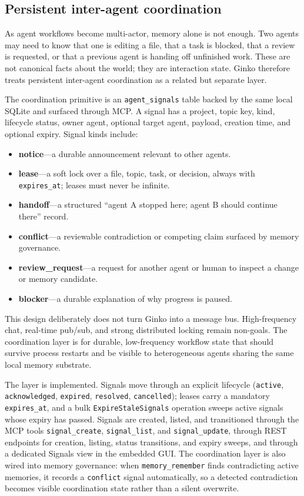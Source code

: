 \documentclass[11pt,a4paper]{article}
\begin{document}
\subsection{Persistent inter-agent coordination}

As agent workflows become multi-actor, memory alone is not enough. Two agents may need to know that one is editing a file, that a task is blocked, that a review is requested, or that a previous agent is handing off unfinished work. These are not canonical facts about the world; they are interaction state. Ginko therefore treats persistent inter-agent coordination as a related but separate layer.

The coordination primitive is an \texttt{agent\_signals} table backed by the same local SQLite and surfaced through MCP. A signal has a project, topic key, kind, lifecycle status, owner agent, optional target agent, payload, creation time, and optional expiry. Signal kinds include:

\begin{itemize}
 \item \textbf{notice}---a durable announcement relevant to other agents.
 \item \textbf{lease}---a soft lock over a file, topic, task, or decision, always with \texttt{expires\_at}; leases must never be infinite.
 \item \textbf{handoff}---a structured ``agent A stopped here; agent B should continue there'' record.
 \item \textbf{conflict}---a reviewable contradiction or competing claim surfaced by memory governance.
 \item \textbf{review\_request}---a request for another agent or human to inspect a change or memory candidate.
 \item \textbf{blocker}---a durable explanation of why progress is paused.
\end{itemize}

This design deliberately does not turn Ginko into a message bus. High-frequency chat, real-time pub/sub, and strong distributed locking remain non-goals. The coordination layer is for durable, low-frequency workflow state that should survive process restarts and be visible to heterogeneous agents sharing the same local memory substrate.

The layer is implemented. Signals move through an explicit lifecycle (\texttt{active}, \texttt{acknowledged}, \texttt{expired}, \texttt{resolved}, \texttt{cancelled}); leases carry a mandatory \texttt{expires\_at}, and a bulk \texttt{ExpireStaleSignals} operation sweeps active signals whose expiry has passed. Signals are created, listed, and transitioned through the MCP tools \texttt{signal\_create}, \texttt{signal\_list}, and \texttt{signal\_update}, through REST endpoints for creation, listing, status transitions, and expiry sweeps, and through a dedicated Signals view in the embedded GUI. The coordination layer is also wired into memory governance: when \texttt{memory\_remember} finds contradicting active memories, it records a \texttt{conflict} signal automatically, so a detected contradiction becomes visible coordination state rather than a silent overwrite.
\end{document}
